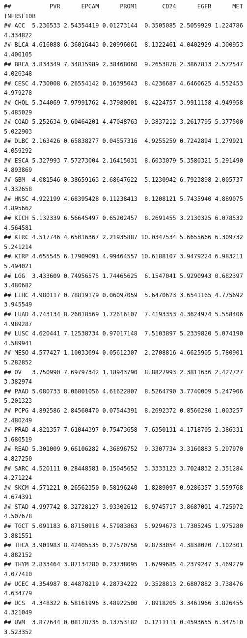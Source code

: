 \documentclass[
]{book}
\begin{document}
\begin{verbatim}
##           PVR      EPCAM      PROM1       CD24      EGFR      MET TNFRSF10B
## ACC  5.236533 2.54354419 0.01273144  0.3505085 2.5059929 1.224786  4.334822
## BLCA 4.616088 6.36016443 0.20996061  8.1322461 4.0402929 4.300953  4.400105
## BRCA 3.834349 7.34815989 2.38468060  9.2653878 2.3867813 2.572547  4.026348
## CESC 4.730008 6.26554142 0.16395043  8.4236687 4.6460625 4.552453  4.979278
## CHOL 5.344069 7.97991762 4.37980601  8.4224757 3.9911158 4.949958  5.485029
## COAD 5.252634 9.60464201 4.47048763  9.3837212 3.2617795 5.377500  5.022903
## DLBC 2.163426 0.65838277 0.04557316  4.9255259 0.7242894 1.279921  4.059292
## ESCA 5.327993 7.57273004 2.16415031  8.6033079 5.3580321 5.291490  4.893869
## GBM  4.081546 0.38659163 2.68647622  5.1230942 6.7923898 2.005737  4.332658
## HNSC 4.922199 4.68395428 0.11238413  8.1208121 5.7435940 4.889075  4.895662
## KICH 5.132339 6.56645497 0.65202457  8.2691455 3.2130325 6.078532  4.564581
## KIRC 4.517746 4.65016367 2.21935887 10.0347534 5.6655666 6.309732  5.241214
## KIRP 4.655545 6.17909091 4.99464557 10.6188107 3.9479224 6.983211  5.494021
## LGG  3.433609 0.74956575 1.74465625  6.1547041 5.9290943 0.682397  3.480682
## LIHC 4.980117 0.78819179 0.06097059  5.6470623 3.6541165 4.775692  3.945549
## LUAD 4.743134 8.26018569 1.72616107  7.4193353 4.3624974 5.558406  4.989287
## LUSC 4.620441 7.12538734 0.97017148  7.5103897 5.2339820 5.074190  4.589941
## MESO 4.577427 1.10033694 0.05612307  2.2708816 4.6625905 5.780901  5.282852
## OV   3.750990 7.69797342 1.18943790  8.8827993 2.3811636 2.427727  3.382974
## PAAD 5.080733 8.06801056 4.61622807  8.5264790 3.7740009 5.247906  5.201323
## PCPG 4.892586 2.84560470 0.07544391  8.2692372 0.8566280 1.003257  2.480249
## PRAD 4.821357 7.61044397 0.75473658  7.6350131 4.1718705 2.386331  3.680519
## READ 5.301009 9.66106282 4.36896752  9.3307734 3.3160883 5.297970  4.827250
## SARC 4.520111 0.28448581 0.15045652  3.3333123 3.7024832 2.351284  4.271224
## SKCM 4.571221 0.26562350 0.58196240  1.8289097 0.9286357 3.559768  4.674391
## STAD 4.997742 8.32728127 3.93302612  8.9745717 3.8687001 4.725972  4.507678
## TGCT 5.091183 6.87150918 4.57983863  5.9294673 1.7305245 1.975280  3.881551
## THCA 3.901983 8.42405535 0.27570756  9.8733054 4.3838020 7.102301  4.882152
## THYM 2.833464 3.87134280 0.23738095  1.6799685 4.2379247 3.469279  4.077410
## UCEC 4.354987 8.44878219 4.28734222  9.3528813 2.6807882 3.738476  4.634779
## UCS  4.348322 6.58161996 3.48922500  7.8918205 3.3461966 3.826455  4.321049
## UVM  3.877644 0.08178735 0.13753182  0.1211111 0.4593655 6.347510  3.523352
\end{verbatim}
\end{document}
